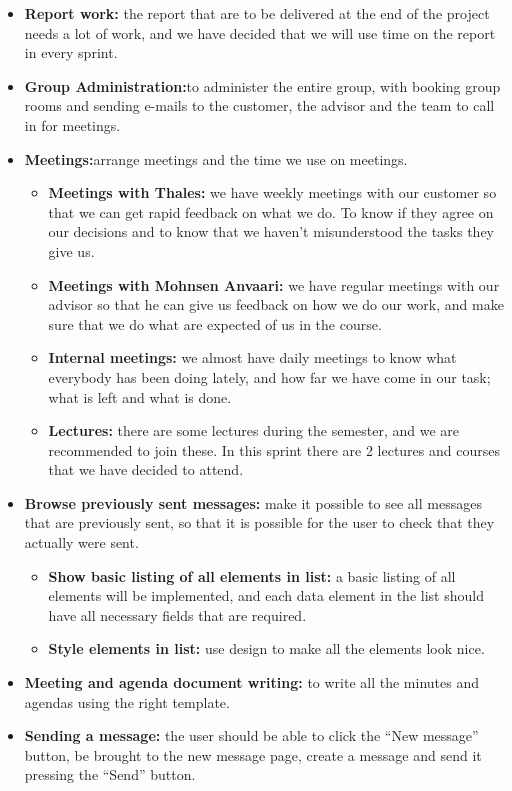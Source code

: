 \begin{itemize}
\item{}\textbf{Report work:} the report that are to be delivered at the end of the project needs a lot of work, and we have decided that we will use time on the report in every sprint.
\item{}\textbf{Group Administration:}to administer the entire group, with booking group rooms and sending e-mails to the customer, the advisor and the team to call in for meetings.
\item{}\textbf{Meetings:}arrange meetings and the time we use on meetings.
\begin{itemize}
\item{}\textbf{Meetings with Thales:} we have weekly meetings with our customer so that we can get rapid feedback on what we do. To know if they agree on our decisions and to know that we haven’t misunderstood the tasks they give us.
\item{}\textbf{Meetings with Mohnsen Anvaari:} we have regular meetings with our advisor so that he can give us feedback on how we do our work, and make sure that we do what are expected of us in the course.
\item{}\textbf{Internal meetings:} we almost have daily meetings to know what everybody has been doing lately, and how far we have come in our task; what is left and what is done.
\item{}\textbf{Lectures:} there are some lectures during the semester, and we are recommended to join these. In this sprint there are 2 lectures and courses that we have decided to attend.
\end{itemize}
\item{}\textbf{Browse previously sent messages:} make it possible to see all messages that are previously sent, so that it is possible for the user to check that they actually were sent.
\begin{itemize}
\item{}\textbf{Show basic listing of all elements in list:} a basic listing of all elements will be implemented, and each data element in the list should have all necessary fields that are required.
\item{}\textbf{Style elements in list:} use design to make all the elements look nice.
\end{itemize}
\item{}\textbf{Meeting and agenda document writing:} to write all the minutes and agendas using the right template.
\item{}\textbf{Sending a message:} the user should be able to click the “New message” button, be brought to the new message page, create a message and send it pressing the “Send” button.

\end{itemize}
